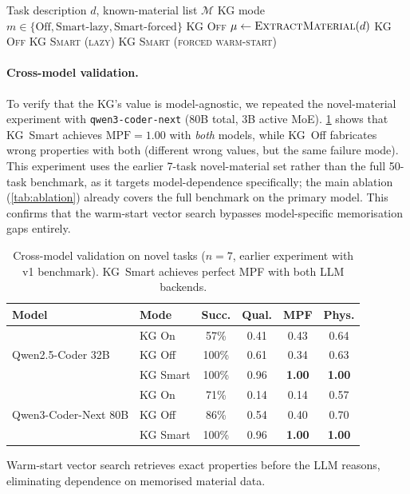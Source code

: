 \documentclass[preprint,review,12pt]{elsarticle}
\begin{document}
\begin{algorithm}[t]
\caption{Adaptive KG Mode Selection}
\label{alg:kg-decision}
\begin{algorithmic}[1]
\Require Task description $d$, known-material list $\mathcal{M}$
\Ensure KG mode $m \in \{\text{Off}, \text{Smart-lazy}, \text{Smart-forced}\}$
  \State \Return \textsc{KG Off}
\EndIf
\State $\mu \gets \textsc{ExtractMaterial}(d)$
\If{$\mu = \varnothing$}
  \State \Return \textsc{KG Off}
  \State \Return \textsc{KG Smart (lazy)}
\Else
  \State \Return \textsc{KG Smart (forced warm-start)}
\EndIf
\end{algorithmic}
\end{algorithm}

\paragraph{Cross-model validation.}
To verify that the KG's value is model-agnostic, we repeated the
novel-material experiment with \texttt{qwen3-coder-next} (80B total,
3B active MoE).  \cref{tab:multi-model} shows that KG~Smart achieves
$\text{MPF}{=}1.00$ with \emph{both} models, while KG~Off fabricates
wrong properties with both (different wrong values, but the same
failure mode).  This experiment uses the earlier 7-task novel-material
set rather than the full 50-task benchmark, as it targets
model-dependence specifically; the main ablation (\cref{tab:ablation})
already covers the full benchmark on the primary model.
This confirms that the warm-start vector search
bypasses model-specific memorisation gaps entirely.

\begin{table}[t]
\centering
\caption{Cross-model validation on novel tasks ($n{=}7$, earlier
  experiment with v1 benchmark).  KG~Smart achieves perfect MPF with
  both LLM backends.}
\label{tab:multi-model}
\footnotesize
\setlength{\tabcolsep}{3pt}
\begin{tabular}{@{}llcccc@{}}
\toprule
Model & Mode & Succ. & Qual. & MPF & Phys. \\
\midrule
\multirow{3}{*}{Qwen2.5-Coder 32B}
  & KG On    & 57\% & 0.41 & 0.43 & 0.64 \\
  & KG Off   & 100\% & 0.61 & 0.34 & 0.63 \\
  & KG Smart & 100\% & 0.96 & \textbf{1.00} & \textbf{1.00} \\
\midrule
\multirow{3}{*}{Qwen3-Coder-Next 80B}
  & KG On    &  71\% & 0.14 & 0.14 & 0.57 \\
  & KG Off   &  86\% & 0.54 & 0.40 & 0.70 \\
  & KG Smart & 100\% & 0.96 & \textbf{1.00} & \textbf{1.00} \\
\bottomrule
\end{tabular}

\vspace{0.3em}
{\scriptsize Warm-start vector search retrieves exact properties before the
LLM reasons, eliminating dependence on memorised material data.}
\end{table}
\end{document}

